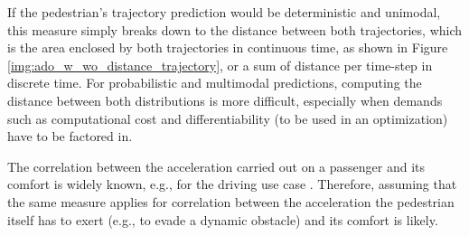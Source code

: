 If the pedestrian's trajectory prediction would be deterministic and unimodal, this measure simply breaks down to the distance between both trajectories, which is the area enclosed by both trajectories in continuous time, as shown in Figure \ref{img:ado_w_wo_distance_trajectory}, or a sum of distance per time-step in discrete time. For probabilistic and multimodal predictions, computing the distance between both distributions is more difficult, especially when demands such as computational cost and differentiability (to be used in an optimization) have to be factored in. 

%
%       
%    
%    

The correlation between the acceleration carried out on a passenger and its comfort is widely known, e.g., for the driving use case \cite{Hoberock1976}. Therefore, assuming that the same measure applies for correlation between the acceleration the pedestrian itself has to exert (e.g., to evade a dynamic obstacle) and its comfort is likely. 


